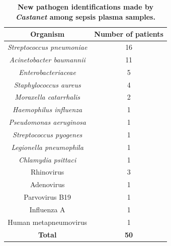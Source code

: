\begin{table}[]
\begin{center}
\begin{tabular}{|c|c|}
\hline
\textbf{Organism}                 & \textbf{Number of patients} \\ \hline
\textit{Streptococcus pneumoniae} & 16                          \\ \hline
\textit{Acinetobacter baumannii}  & 11                          \\ \hline
\textit{Enterobacteriaceae}       & 5                           \\ \hline
\textit{Staphylococcus aureus}    & 4                           \\ \hline
\textit{Moraxella catarrhalis}    & 2                           \\ \hline
\textit{Haemophilus influenza}    & 1                           \\ \hline
\textit{Pseudomonas aeruginosa}   & 1                           \\ \hline
\textit{Streptococcus pyogenes}   & 1                           \\ \hline
\textit{Legionella pneumophila}   & 1                           \\ \hline
\textit{Chlamydia psittaci}       & 1                           \\ \hline
Rhinovirus                        & 3                           \\ \hline
Adenovirus                        & 1                           \\ \hline
Parvovirus B19                    & 1                           \\ \hline
Influenza A                       & 1                           \\ \hline
Human metapneumovirus             & 1                           \\ \hline
\textbf{Total}                    & \textbf{50}                 \\ \hline
\end{tabular}
\end{center}
\smallskip
\caption[New pathogens identified by \textit{Castanet}] {\textbf{New pathogen identifications made by \textit{Castanet} among sepsis plasma samples.} } 
\label{tab:gains-unknown}
\end{table}

